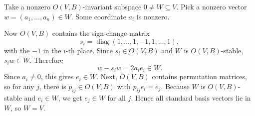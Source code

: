 \documentclass[12pt]{article}
\begin{document}
\begin{solution}
    Take a nonzero $O(V,B)$-invariant subspace $0\neq W\subseteq V$. Pick a nonzero vector $w=(a_1,\dots,a_n)\in W$. Some coordinate $a_i$ is nonzero.

    Now $O(V,B)$ contains the sign-change matrix
    \[
        s_i=\operatorname{diag}(1,\dots,1,-1,1,\dots,1),
    \]
    with the $-1$ in the $i$-th place. Since $s_i\in O(V,B)$ and $W$ is $O(V,B)$-stable,
    $s_i w\in W$.
    Therefore
    \[
        w-s_i w = 2a_i e_i \in W.
    \]
    Since $a_i\neq 0$, this gives $e_i\in W$. Next, $O(V,B)$ contains permutation matrices, so for any $j$, there is $p_{ij}\in O(V,B)$ with
    $p_{ij} e_i=e_j$.
    Because $W$ is $O(V,B)$-stable and $e_i\in W$, we get
    $e_j\in W$ for all $j$.
    Hence all standard basis vectors lie in $W$, so $W=V$.
\end{solution}
\end{document}
